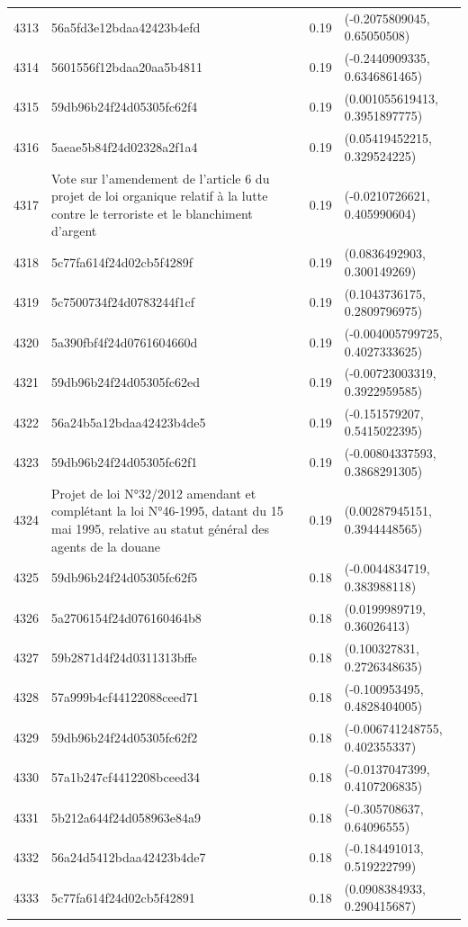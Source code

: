 \begin{table}[ht]
\begin{tabular}{rlrl}
  4313 & 56a5fd3e12bdaa42423b4efd & 0.19 & (-0.2075809045, 0.65050508) \\ 
  4314 & 5601556f12bdaa20aa5b4811 & 0.19 & (-0.2440909335, 0.6346861465) \\ 
  4315 & 59db96b24f24d05305fc62f4 & 0.19 & (0.001055619413, 0.3951897775) \\ 
  4316 & 5aeae5b84f24d02328a2f1a4 & 0.19 & (0.05419452215, 0.329524225) \\ 
  4317 & Vote sur l'amendement de l'article 6 du projet de loi organique relatif à la lutte contre le terroriste et le blanchiment d'argent & 0.19 & (-0.0210726621, 0.405990604) \\ 
  4318 & 5c77fa614f24d02cb5f4289f & 0.19 & (0.0836492903, 0.300149269) \\ 
  4319 & 5c7500734f24d0783244f1cf & 0.19 & (0.1043736175, 0.2809796975) \\ 
  4320 & 5a390fbf4f24d0761604660d & 0.19 & (-0.004005799725, 0.4027333625) \\ 
  4321 & 59db96b24f24d05305fc62ed & 0.19 & (-0.00723003319, 0.3922959585) \\ 
  4322 & 56a24b5a12bdaa42423b4de5 & 0.19 & (-0.151579207, 0.5415022395) \\ 
  4323 & 59db96b24f24d05305fc62f1 & 0.19 & (-0.00804337593, 0.3868291305) \\ 
  4324 & Projet de loi N°32/2012 amendant et complétant la loi N°46-1995, datant du 15 mai 1995, relative au statut général des agents de la douane & 0.19 & (0.00287945151, 0.3944448565) \\ 
  4325 & 59db96b24f24d05305fc62f5 & 0.18 & (-0.0044834719, 0.383988118) \\ 
  4326 & 5a2706154f24d076160464b8 & 0.18 & (0.0199989719, 0.36026413) \\ 
  4327 & 59b2871d4f24d0311313bffe & 0.18 & (0.100327831, 0.2726348635) \\ 
  4328 & 57a999b4cf44122088ceed71 & 0.18 & (-0.100953495, 0.4828404005) \\ 
  4329 & 59db96b24f24d05305fc62f2 & 0.18 & (-0.006741248755, 0.402355337) \\ 
  4330 & 57a1b247cf4412208bceed34 & 0.18 & (-0.0137047399, 0.4107206835) \\ 
  4331 & 5b212a644f24d058963e84a9 & 0.18 & (-0.305708637, 0.64096555) \\ 
  4332 & 56a24d5412bdaa42423b4de7 & 0.18 & (-0.184491013, 0.519222799) \\ 
  4333 & 5c77fa614f24d02cb5f42891 & 0.18 & (0.0908384933, 0.290415687) \\ 

\end{tabular}
\end{table}
